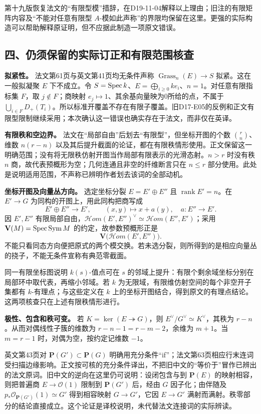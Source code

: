 第十九版恢复法文的“有限型模”措辞，在D19-11-04解释以上理由；旧注的有限矩阵内容及“不能对任意有限型 $A$-模如此声称”的界限均保留在这里。更强的实际构造可以帮助解释原证明，但不应据此制造一项原文错误。

\subsection*{四、仍须保留的实际订正和有限范围核查}

\noindent\textbf{拟紧性。}
法文第61页与英文第41页均无条件声称 $\operatorname{Grass}_n(E)\to S$ 拟紧。这在一般拟凝聚 $E$ 下不成立。令 $S=\operatorname{Spec} k$、$E=\bigoplus_{i\geq0}ke_i$、$n=1$。对任意有限指标集 $F$，取 $j\notin F$；商映射 $e_j\mapsto1$、其余基向量映为0所给的点，不属于 $\bigcup_{i\in F}D_+(T_i)$。所以标准开覆盖不存在有限子覆盖。旧D17-E05的反例和正文有限型限制继续采用；本次确认这一错误也确实存在于法文，而非仅在英译。

\noindent\textbf{有限秩和空边界。}
法文在“局部自由”后划去“有限型”，但坐标开图的个数 $\binom rn$、维数 $n(r-n)$ 以及其后提升截面的论证，都在有限秩情形使用。正文保留这一明确范围；没有将无限秩仿射开图当作局部有限表示的光滑态射。$n>r$ 时没有秩 $n$ 商，故代表预概形为空；几何连通且非空的纤维断言只在 $n\leq r$ 部分使用。此处是说明适用范围，不声称已辨明作者划去该词的全部动机。

\noindent\textbf{坐标开图及向量丛方向。}
选定坐标分裂 $E=E'\oplus E''$ 且 $\operatorname{rank}E'=n$。在 $E'\to G$ 为同构的开图上，用此同构把商写成
\[
E'\oplus E''\longrightarrow E',\qquad (x,y)\longmapsto x+a(y),
\quad a:E''\longrightarrow E'.
\]
因 $E',E''$ 有限局部自由，$\mathscr Hom(E',E'')^\vee\simeq\mathscr Hom(E'',E')$；采用 $\mathbf V(M)=\operatorname{Spec}\operatorname{Sym}M$ 的约定，故参数预概形正是
\[
\mathbf V\bigl(\mathscr Hom(E',E'')\bigr).
\]
不能只看同态方向便把原式的两个模交换。若未选分裂，则所得到的是相应向量丛的挠子，不能无条件宣称有典范零截面。

同一有限坐标图说明 $k(s)$-值点可在 $s$ 的邻域上提升：有限个剩余域坐标分别在局部环中取代表，再缩小邻域。若 $k$ 为无限域，有限维仿射空间的每个非空开子集都有 $k$-有理点；与这些定义在 $k$ 上的坐标开图结合，得到原文的有理点结论。这两项核查只在上述有限秩情形进行。

\noindent\textbf{极性、包含和秩可变。}
若 $K=\ker(E\twoheadrightarrow G)$，则 $E^\vee/G^\vee\simeq K^\vee$，其秩为 $r-n$。从而对偶线性子簇的维数为 $r-n-1=r-m-2$，余维为 $m+1$。当 $m=r-1$ 时，对偶为空，按约定记维数 $-1$。

英文第43页对 $\mathbf P(G')\subset\mathbf P(G)$ 明确用充分条件“if”；法文第63页相应行末连词受扫描边缘影响。正文按可核的充分条件译出，不把旧中文的“等价于”冒作已辨出的法文原词。旧中文的逆向在这里仍可说明：设闭包含与到 $\mathbf P(E)$ 的映射相容，则把普遍商 $E\to\mathcal O(1)$ 限制到 $\mathbf P(G')$ 后，经由 $G$ 因子化；由伴随及 $p_*\mathcal O_{\mathbf P(G')}(1)\simeq G'$ 得到相容映射 $G\to G'$，它因 $E\to G'$ 满射而满射。秩零部分的结论直接成立。这个论证是译校说明，未代替法文连接词的实际辨读。


